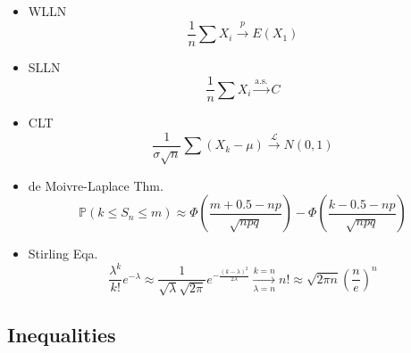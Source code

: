 \begin{itemize}
    \item WLLN
\begin{equation}    \frac{1}{n}\sum X_i\xrightarrow[]{p} E(X_1)
\end{equation}
\item SLLN
\begin{equation}    \frac{1}{n}\sum X_i\xrightarrow[]{\text{a.s.}}  C
\end{equation}
\item CLT
\begin{equation}    \frac{1}{\sigma\sqrt{n}}\sum(X_k-\mu)\xrightarrow[]{\mathscr{L}} N(0,1)
\end{equation}
\item de Moivre-Laplace Thm.
\begin{equation}    \mathbb{P}(k\leq S_n\leq m)\approx \Phi(\frac{m+0.5-np}{\sqrt{npq}})-\Phi(\frac{k-0.5-np}{\sqrt{npq}})
\end{equation}
\item Stirling Eqa.
\begin{equation}    \frac{\lambda^k}{k!}e^{-\lambda}\approx \frac{1}{\sqrt{\lambda}\sqrt{2\pi}}e^{-\frac{(k-\lambda)^2}{2\lambda}}\xrightarrow[\lambda=n]{k=n}n!\approx\sqrt{2\pi n}(\frac{n}{e})^n
\end{equation}

\end{itemize}


\subsection{Inequalities}
    
